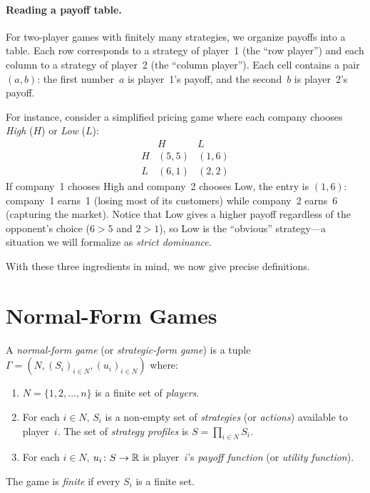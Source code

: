 \documentclass[11pt,a4paper]{article}
\begin{document}
\paragraph{Reading a payoff table.}
For two-player games with finitely many strategies, we organize payoffs
into a table.  Each row corresponds to a strategy of player~1 (the ``row
player'') and each column to a strategy of player~2 (the ``column
player'').  Each cell contains a pair $(a, b)$: the first number~$a$ is
player~1's payoff, and the second~$b$ is player~2's payoff.

For instance, consider a simplified pricing game where each company
chooses \emph{High} ($H$) or \emph{Low} ($L$):
\[
\begin{array}{c|cc}
    & H & L \\ \hline
  H & (5, 5) & (1, 6) \\
  L & (6, 1) & (2, 2)
\end{array}
\]
If company~1 chooses High and company~2 chooses Low, the entry is
$(1, 6)$: company~1 earns~1 (losing most of its customers) while company~2
earns~6 (capturing the market).  Notice that Low gives a higher payoff
regardless of the opponent's choice ($6 > 5$ and $2 > 1$), so Low is the
``obvious'' strategy---a situation we will formalize as \emph{strict
dominance}.

With these three ingredients in mind, we now give precise definitions.


\section{Normal-Form Games}
\label{sec:normal_form}

\begin{definition}
\label{def:normal_form}
A \emph{normal-form game} (or \emph{strategic-form game}) is a tuple
$\Gamma = (N, (S_i)_{i \in N}, (u_i)_{i \in N})$ where:
\begin{enumerate}[nosep,label=(\roman*)]
    \item $N = \{1, 2, \ldots, n\}$ is a finite set of \emph{players}.
    \item For each $i \in N$, $S_i$ is a non-empty set of \emph{strategies}
    (or \emph{actions}) available to player~$i$.  The set of
    \emph{strategy profiles} is $S = \prod_{i \in N} S_i$.
    \item For each $i \in N$, $u_i \colon S \to \mathbb{R}$ is player~$i$'s
    \emph{payoff function} (or \emph{utility function}).
\end{enumerate}
The game is \emph{finite} if every $S_i$ is a finite set.
\end{definition}
\end{document}
